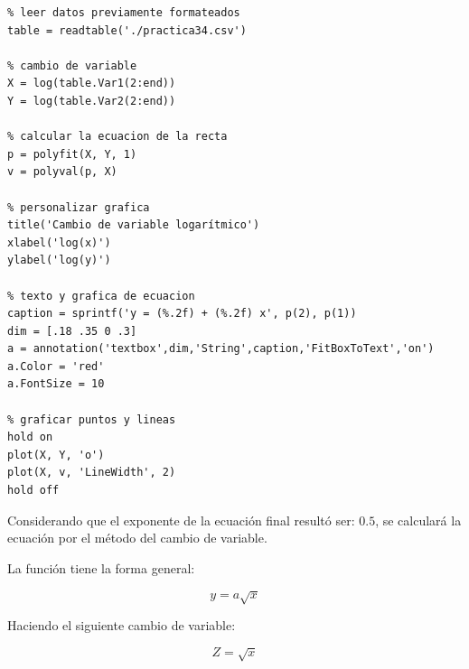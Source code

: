 \documentclass[letter,11pt]{article}
\begin{document}
\footnotesize
\begin{verbatim}
% leer datos previamente formateados
table = readtable('./practica34.csv')

% cambio de variable
X = log(table.Var1(2:end))
Y = log(table.Var2(2:end))

% calcular la ecuacion de la recta
p = polyfit(X, Y, 1)
v = polyval(p, X)

% personalizar grafica
title('Cambio de variable logarítmico')
xlabel('log(x)')
ylabel('log(y)')

% texto y grafica de ecuacion
caption = sprintf('y = (%.2f) + (%.2f) x', p(2), p(1))
dim = [.18 .35 0 .3]
a = annotation('textbox',dim,'String',caption,'FitBoxToText','on')
a.Color = 'red'
a.FontSize = 10

% graficar puntos y lineas
hold on
plot(X, Y, 'o')
plot(X, v, 'LineWidth', 2)
hold off
\end{verbatim}
\normalsize

Considerando que el exponente de la ecuación final resultó ser: $0.5$, se
calculará la ecuación por el método del cambio de variable.

La función tiene la forma general:

\begin{equation}
    y = a \sqrt{x}
\end{equation}

Haciendo el siguiente cambio de variable:

\begin{equation*}
    Z = \sqrt{x}
\end{equation*}
\end{document}
